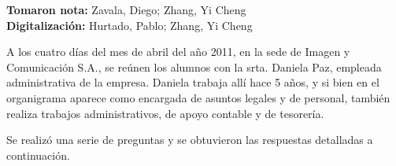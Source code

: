\documentclass[a4paper,10pt,titlepage]{article}
\begin{document}
\textbf{Tomaron nota:} Zavala, Diego; Zhang, Yi Cheng\\
\textbf{Digitalizaci\'on:} Hurtado, Pablo; Zhang, Yi Cheng\\


\newpage


A los cuatro días del mes de abril del a\~no 2011, en la sede de Imagen y Comunicaci\'on S.A., se re\'unen los alumnos con la srta. Daniela Paz, empleada administrativa de la empresa.
Daniela trabaja all\'i hace 5 a\~nos, y si bien en el organigrama aparece como encargada de asuntos legales y de personal, tambi\'en realiza trabajos administrativos, de apoyo contable y de tesorer\'ia.

Se realiz\'o una serie de preguntas y se obtuvieron las respuestas detalladas a continuaci\'on.

\begin{itemize}


\end{itemize}
\end{document}
